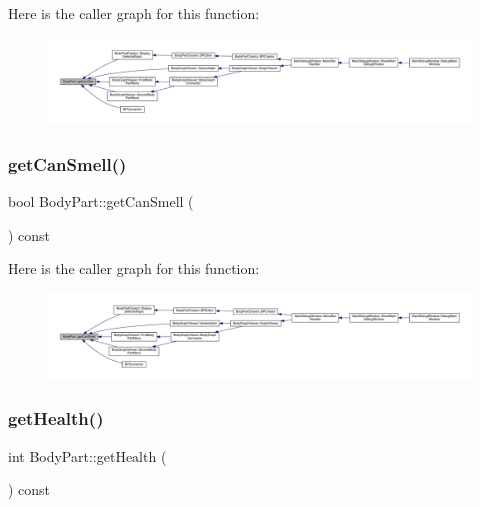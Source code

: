 Here is the caller graph for this function\+:
\nopagebreak
\begin{figure}[H]
\begin{center}
\leavevmode
\includegraphics[width=350pt]{d2/d6f/class_body_part_ab1a17aec7b3aa4d388fb9c8421cdc519_icgraph}
\end{center}
\end{figure}
\mbox{\label{class_body_part_a9a954b18bd4bee1a8a2dea9d3464fd29}} 
\subsubsection{\texorpdfstring{get\+Can\+Smell()}{getCanSmell()}}
{\footnotesize\ttfamily bool Body\+Part\+::get\+Can\+Smell (\begin{DoxyParamCaption}{ }\end{DoxyParamCaption}) const}

Here is the caller graph for this function\+:
\nopagebreak
\begin{figure}[H]
\begin{center}
\leavevmode
\includegraphics[width=350pt]{d2/d6f/class_body_part_a9a954b18bd4bee1a8a2dea9d3464fd29_icgraph}
\end{center}
\end{figure}
\mbox{\label{class_body_part_a3d5dd1bc03733a80fc0058dcbd6cddd8}} 
\subsubsection{\texorpdfstring{get\+Health()}{getHealth()}}
{\footnotesize\ttfamily int Body\+Part\+::get\+Health (\begin{DoxyParamCaption}{ }\end{DoxyParamCaption}) const}

